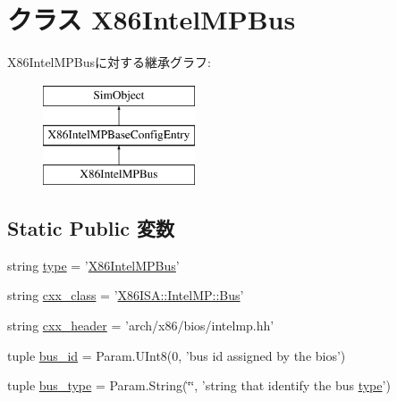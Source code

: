 \hypertarget{classIntelMP_1_1X86IntelMPBus}{
\section{クラス X86IntelMPBus}
\label{classIntelMP_1_1X86IntelMPBus}
}
X86IntelMPBusに対する継承グラフ:\begin{figure}[H]
\begin{center}
\leavevmode
\includegraphics[height=3cm]{classIntelMP_1_1X86IntelMPBus}
\end{center}
\end{figure}
\subsection*{Static Public 変数}
\begin{DoxyCompactItemize}
\item 
string \hyperlink{classIntelMP_1_1X86IntelMPBus_acce15679d830831b0bbe8ebc2a60b2ca}{type} = '\hyperlink{classIntelMP_1_1X86IntelMPBus}{X86IntelMPBus}'
\item 
string \hyperlink{classIntelMP_1_1X86IntelMPBus_a58cd55cd4023648e138237cfc0822ae3}{cxx\_\-class} = '\hyperlink{classX86ISA_1_1IntelMP_1_1Bus}{X86ISA::IntelMP::Bus}'
\item 
string \hyperlink{classIntelMP_1_1X86IntelMPBus_a17da7064bc5c518791f0c891eff05fda}{cxx\_\-header} = 'arch/x86/bios/intelmp.hh'
\item 
tuple \hyperlink{classIntelMP_1_1X86IntelMPBus_a6e34d01145c4deea78b58e36f0a7e81b}{bus\_\-id} = Param.UInt8(0, 'bus id assigned by the bios')
\item 
tuple \hyperlink{classIntelMP_1_1X86IntelMPBus_af3235df6397cf9b9f67ea06e6d675121}{bus\_\-type} = Param.String(\char`\"{}\char`\"{}, 'string that identify the bus \hyperlink{classIntelMP_1_1X86IntelMPBus_acce15679d830831b0bbe8ebc2a60b2ca}{type}')
\end{DoxyCompactItemize}


